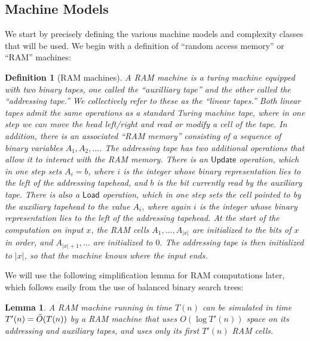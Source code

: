 \documentclass[11pt]{article}
\newtheorem{lemma}{Lemma}
\newtheorem{definition}{Definition}
\begin{document}
\subsection{Machine Models}\label{subsec:machines}
We start by precisely defining the various machine models and complexity classes that will be used. We begin with a definition of ``random access memory'' or ``RAM'' machines:
\begin{definition}[RAM machines]
A RAM machine is a turing machine equipped with two binary tapes, one called the ``auxilliary tape'' and the other called the ``addressing tape.'' We collectively refer to these as the ``linear tapes.'' Both linear tapes admit the same operations as a standard Turing machine tape, where in one step we can move the head left/right and read or modify a cell of the tape. In addition, there is an associated ``RAM memory'' consisting of a sequence of binary variables $A_1,A_2,\ldots$. The addressing tape has two additional operations that allow it to interact with the RAM memory. There is an $\mathsf{Update}$ operation, which in one step sets $A_i = b$, where $i$ is the integer whose binary representation lies to the left of the addressing tapehead, and $b$ is the bit currently read by the auxiliary tape. There is also a $\mathsf{Load}$ operation, which in one step sets the cell pointed to by the auxiliary tapehead to the value $A_i$, where again $i$ is the integer whose binary representation lies to the left of the addressing tapehead. At the start of the computation on input $x$, the RAM cells $A_1,\ldots,A_{|x|}$ are initialized to the bits of $x$ in order, and $A_{|x|+1}, \ldots$ are initialized to $0$. The addressing tape is then initialized to $|x|$, so that the machine knows where the input ends.
\end{definition}
We will use the following simplification lemma for RAM computations later, which follows easily from the use of balanced binary search trees:
\begin{lemma}\label{lem:ram-bst}\cite{NLT}
A RAM machine running in time $T(n)$ can be simulated in time $T'(n) = \Tilde{O}(T(n))$ by a RAM machine that uses $O(\log T'(n))$ space on its addressing and auxiliary tapes, and uses only its first $T'(n)$ RAM cells.
\end{lemma}
\end{document}
